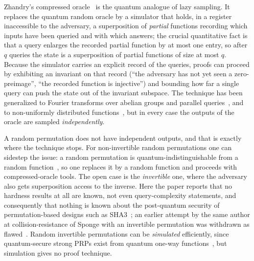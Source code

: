 \documentclass{aicr-conjecture}
\begin{document}
Zhandry's compressed oracle~\cite{Zha19} is the quantum analogue of
lazy sampling. It replaces the quantum random oracle by a simulator
that holds, in a register inaccessible to the adversary, a
superposition of \emph{partial} functions recording which inputs have
been queried and with which answers; the crucial quantitative fact is
that a query enlarges the recorded partial function by at most one
entry, so after $q$ queries the state is a superposition of partial
functions of size at most $q$. Because the simulator carries an
explicit record of the queries, proofs can proceed by exhibiting an
invariant on that record (``the adversary has not yet seen a
zero-preimage'', ``the recorded function is injective'') and bounding
how far a single query can push the state out of the invariant
subspace. The technique has been generalized to Fourier transforms over
abelian groups and parallel queries~\cite{CFHL20}, and to
non-uniformly distributed functions~\cite{CMSZ20}, but in every case
the outputs of the oracle are sampled \emph{independently}.

A random permutation does not have independent outputs, and that is
exactly where the technique stops. For non-invertible random
permutations one can sidestep the issue: a random permutation is
quantum-indistinguishable from a random function~\cite{Zha15}, so one
replaces it by a random function and proceeds with compressed-oracle
tools. The open case is the \emph{invertible} one, where the adversary
also gets superposition access to the inverse. Here the paper reports
that no hardness results at all are known, not even query-complexity
statements, and consequently that nothing is known about the
post-quantum security of permutation-based designs such as
SHA3~\cite{NIST}; an earlier attempt by the same author at
collision-resistance of Sponge with an invertible permutation was
withdrawn as flawed~\cite{Unruh21}. Random invertible permutations can
be \emph{simulated} efficiently, since quantum-secure strong PRPs exist
from quantum one-way functions~\cite{Zha16}, but simulation gives no
proof technique.
\end{document}
